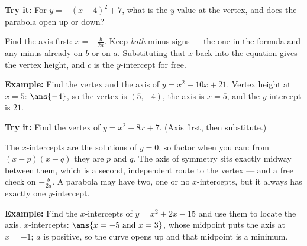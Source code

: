 \documentclass[12pt]{article}
\begin{document}
\begin{tryitbox}
\textbf{Try it:} For $y = -(x-4)^2 + 7$, what is the $y$-value at the vertex,
and does the parabola open up or down?\\[2pt]
\end{tryitbox}


\begin{formulabox}
Find the axis first: $x = -\frac{b}{2a}$. Keep \emph{both} minus signs --- the
one in the formula and any minus already on $b$ or on $a$. Substituting that
$x$ back into the equation gives the vertex height, and $c$ is the
$y$-intercept for free.
\end{formulabox}

\begin{examplebox}
\textbf{Example:} Find the vertex and the axis of $y = x^2 - 10x + 21$.
Vertex height at $x = 5$: $\ans{-4}$, so the vertex is $(5,-4)$, the axis is
$x = 5$, and the $y$-intercept is $21$.
\end{examplebox}

\begin{tryitbox}
\textbf{Try it:} Find the vertex of $y = x^2 + 8x + 7$. (Axis first, then
substitute.)\\[2pt]
\end{tryitbox}


\begin{formulabox}
The $x$-intercepts are the solutions of $y = 0$, so factor when you can: from
$(x-p)(x-q)$ they are $p$ and $q$. The axis of symmetry sits exactly midway
between them, which is a second, independent route to the vertex --- and a free
check on $-\frac{b}{2a}$. A parabola may have two, one or no $x$-intercepts,
but it always has exactly one $y$-intercept.
\end{formulabox}

\begin{examplebox}
\textbf{Example:} Find the $x$-intercepts of $y = x^2 + 2x - 15$ and use them
to locate the axis.
$x$-intercepts: $\ans{x = -5 \text{ and } x = 3}$, whose midpoint puts the axis
at $x = -1$; $a$ is positive, so the curve opens up and that midpoint is a
minimum.
\end{examplebox}
\end{document}
